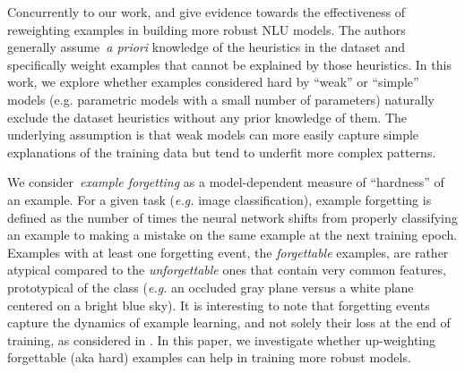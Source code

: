 Concurrently to our work,  and  give evidence towards the effectiveness of reweighting examples in building more robust NLU models. The authors generally assume~\emph{a priori} knowledge of the heuristics in the dataset and specifically weight examples that cannot be explained by those heuristics. In this work, we explore whether examples considered hard by ``weak'' or ``simple'' models (e.g. parametric models with a small number of parameters) naturally exclude the dataset heuristics without any prior knowledge of them. The underlying assumption is that weak models can more easily capture simple explanations of the training data but tend to underfit more complex patterns.

We consider~\emph{example forgetting} \cite{toneva2018empirical} as a model-dependent measure of ``hardness'' of an example. For a given task (\textit{e.g.} image classification), example forgetting is defined as the number of times the neural network shifts from properly classifying an example to making a mistake on the same example at the next training epoch. Examples with at least one forgetting event, the \emph{forgettable} examples, are rather atypical compared to the \emph{unforgettable} ones that contain very common features, prototypical of the class (\textit{e.g.} an occluded gray plane versus a white plane centered on a bright blue sky). It is interesting to note that forgetting events capture the dynamics of example learning, and not solely their loss at the end of training, as considered in . In this paper, we investigate whether up-weighting forgettable (aka hard) examples can help in training more robust models.  


